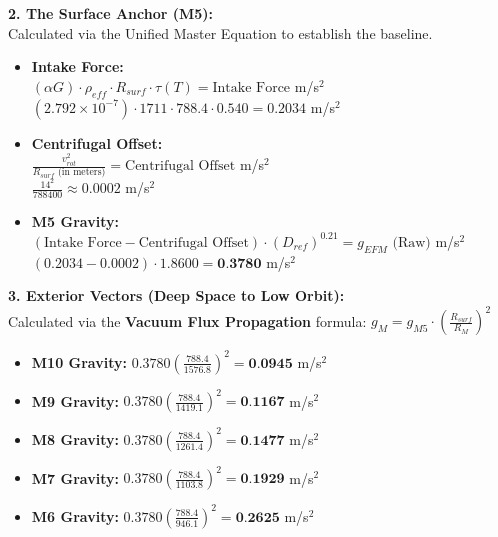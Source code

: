 \documentclass[11pt, a4paper]{article}
\begin{document}
  \vspace{1.0em}
  \noindent \textbf{2. The Surface Anchor (M5):} \\
  \hspace*{1em} Calculated via the Unified Master Equation to establish the baseline.
  \begin{itemize}
    \item \textbf{Intake Force:} \\[0.5em]
    \hspace*{2em} $(\alpha G) \cdot \rho_{eff} \cdot R_{surf} \cdot \tau(T) = \text{Intake Force}$ m/s$^2$ \\[1em]
    \hspace*{2em} $(2.792 \times 10^{-7}) \cdot 1711 \cdot 788.4 \cdot 0.540 = 0.2034$ m/s$^2$
    
    \item \textbf{Centrifugal Offset:} \\[0.5em]
    \hspace*{2em} $\frac{v_{rot}^2}{R_{surf} \text{ (in meters)}} = \text{Centrifugal Offset}$ m/s$^2$ \\[1em]
    \hspace*{2em} $\frac{14^2}{788400} \approx 0.0002$ m/s$^2$
    
    \item \textbf{M5 Gravity:} \\[0.5em]
    \hspace*{2em} $(\text{Intake Force} - \text{Centrifugal Offset}) \cdot (D_{ref})^{0.21} = g_{EFM} \text{ (Raw)}$ m/s$^2$ \\[1em]
    \hspace*{2em} $(0.2034 - 0.0002) \cdot 1.8600 = \textbf{0.3780}$ m/s$^2$
  \end{itemize}

  \clearpage
  \noindent \textbf{3. Exterior Vectors (Deep Space to Low Orbit):} \\
  \hspace*{1em} Calculated via the \textbf{Vacuum Flux Propagation} formula: $g_M = g_{M5} \cdot \left( \frac{R_{surf}}{R_M} \right)^2$
  \begin{itemize}
    \item \textbf{M10 Gravity:} $0.3780 \left( \frac{788.4}{1576.8} \right)^2 = \textbf{0.0945}$ m/s$^2$
    \item \textbf{M9 Gravity:} $0.3780 \left( \frac{788.4}{1419.1} \right)^2 = \textbf{0.1167}$ m/s$^2$
    \item \textbf{M8 Gravity:} $0.3780 \left( \frac{788.4}{1261.4} \right)^2 = \textbf{0.1477}$ m/s$^2$
    \item \textbf{M7 Gravity:} $0.3780 \left( \frac{788.4}{1103.8} \right)^2 = \textbf{0.1929}$ m/s$^2$
    \item \textbf{M6 Gravity:} $0.3780 \left( \frac{788.4}{946.1} \right)^2 = \textbf{0.2625}$ m/s$^2$
  \end{itemize}
\end{document}
